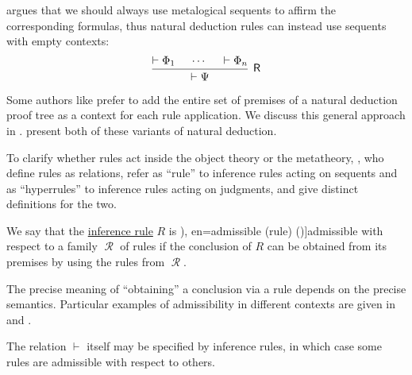 \begin{remark}
   argues that we should always use metalogical sequents to affirm the corresponding formulas, thus natural deduction rules can instead use sequents with empty contexts:
  \begin{equation*}
    \begin{prooftree}
      \hypo{ \vdash \Phi_1 }
      \hypo{ \cdots }
      \hypo{ \vdash \Phi_n }
      \infer3[\logic{R}]{ \vdash \Psi }
    \end{prooftree}
  \end{equation*}

  Some authors like  prefer to add the entire set of premises of a natural deduction proof tree as a context for each rule application. We discuss this general approach in .  present both of these variants of natural deduction.

  To clarify whether rules act inside the object theory or the metatheory, , who define rules as relations, refer as \enquote{rule} to inference rules acting on sequents and as \enquote{hyperrules} to inference rules acting on judgments, and give distinct definitions for the two.
\end{remark}

\begin{concept}\label{con:inference_rule_admissibility}\mimprovised
  We say that the \hyperref[def:inference_rule]{inference rule} \( R \) is \term[ru=допустимое (правило) (\cite[252]{Герасимов2011Вычислимость}), en=admissible (rule) (\cite[76]{TroelstraSchwichtenberg2000Proofs})]{admissible} with respect to a family \( \mscrR \) of rules if the conclusion of \( R \) can be obtained from its premises by using the rules from \( \mscrR \).
\end{concept}
\begin{comments}
  \item The precise meaning of \enquote{obtaining} a conclusion via a rule depends on the precise semantics. Particular examples of admissibility in different contexts are given in  and .

  \item The relation \( {\vdash} \) itself may be specified by inference rules, in which case some rules are admissible with respect to others.
\end{comments}

